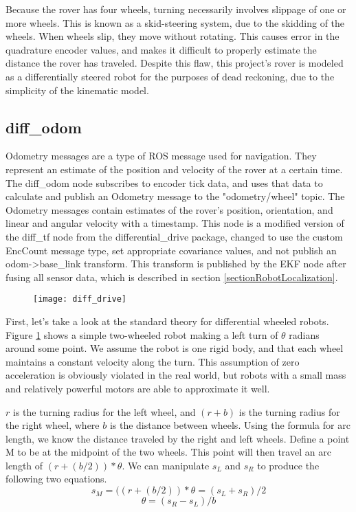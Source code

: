 Because the rover has four wheels, turning necessarily involves slippage of one or more wheels. This is known as a skid-steering system, due to the skidding of the wheels. When wheels slip, they move without rotating. This causes error in the quadrature encoder values, and makes it difficult to properly estimate the distance the rover has traveled. Despite this flaw, this project's rover is modeled as a differentially steered robot for the purposes of dead reckoning, due to the simplicity of the kinematic model. 

\subsection{diff\_odom} \label{sectionOdomPublishing}

Odometry messages are a type of ROS message used for navigation. They represent an estimate of the position and velocity of the rover at a certain time. The diff\_odom node subscribes to encoder tick data, and uses that data to calculate and publish an Odometry message to the "odometry/wheel" topic. The Odometry messages contain estimates of the rover's position, orientation, and linear and angular velocity with a timestamp. This node is a modified version of the diff\_tf node from the differential\_drive package, changed to use the custom EncCount message type, set appropriate covariance values, and not publish an odom->base\_link transform. This transform is published by the EKF node after fusing all sensor data, which is described in section \ref{sectionRobotLocalization}.

\begin{figure}[h]
	\caption{\cite{differentialSteeringPaper}}
	\centering
	\texttt{[image: diff\_drive]}
	\label{figDiffDrive}
\end{figure}

First, let's take a look at the standard theory for differential wheeled robots. Figure \ref{figDiffDrive} shows a simple two-wheeled robot making a left turn of \(\theta\) radians around some point. We assume the robot is one rigid body, and that each wheel maintains a constant velocity along the turn. This assumption of zero acceleration is obviously violated in the real world, but robots with a small mass and relatively powerful motors are able to approximate it well. \cite{differentialSteeringPaper}

\(r\) is the turning radius for the left wheel, and \((r+b)\) is the turning radius for the right wheel, where \(b\) is the distance between wheels. Using the formula for arc length, we know the distance traveled by the right and left wheels. Define a point M to be at the midpoint of the two wheels. This point will then travel an arc length of \((r+(b/2)) * \theta \). We can manipulate \(s_L\) and \(s_R\) to produce the following two equations.
\begin{equation} \label{eqDiffSM}
s_M = ((r+(b/2)) * \theta = (s_L + s_R) / 2
\end{equation}
\begin{equation} \label{eqDiffTheta}
\theta = (s_R - s_L) / b
\end{equation}

